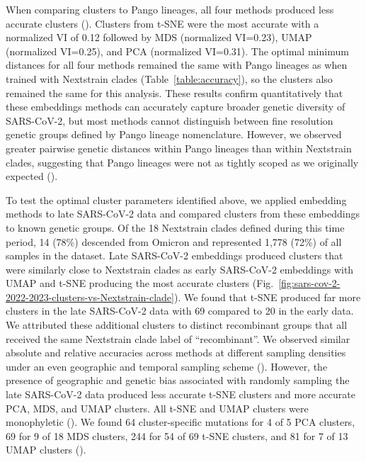 \documentclass[10pt,letterpaper]{article}
\begin{document}
When comparing clusters to Pango lineages, all four methods produced less accurate clusters ().
Clusters from t-SNE were the most accurate with a normalized VI of 0.12 followed by MDS (normalized VI=0.23), UMAP (normalized VI=0.25), and PCA (normalized VI=0.31).
The optimal minimum distances for all four methods remained the same with Pango lineages as when trained with Nextstrain clades (Table~\ref{table:accuracy}), so the clusters also remained the same for this analysis.
These results confirm quantitatively that these embeddings methods can accurately capture broader genetic diversity of SARS-CoV-2, but most methods cannot distinguish between fine resolution genetic groups defined by Pango lineage nomenclature.
However, we observed greater pairwise genetic distances within Pango lineages than within Nextstrain clades, suggesting that Pango lineages were not as tightly scoped as we originally expected ().

To test the optimal cluster parameters identified above, we applied embedding methods to late SARS-CoV-2 data and compared clusters from these embeddings to known genetic groups.
Of the 18 Nextstrain clades defined during this time period, 14 (78\%) descended from Omicron and represented 1,778 (72\%) of all samples in the dataset.
Late SARS-CoV-2 embeddings produced clusters that were similarly close to Nextstrain clades as early SARS-CoV-2 embeddings with UMAP and t-SNE producing the most accurate clusters (Fig.~\ref{fig:sars-cov-2-2022-2023-clusters-vs-Nextstrain-clade}).
We found that t-SNE produced far more clusters in the late SARS-CoV-2 data with 69 compared to 20 in the early data.
We attributed these additional clusters to distinct recombinant groups that all received the same Nextstrain clade label of ``recombinant''.
We observed similar absolute and relative accuracies across methods at different sampling densities under an even geographic and temporal sampling scheme ().
However, the presence of geographic and genetic bias associated with randomly sampling the late SARS-CoV-2 data produced less accurate t-SNE clusters and more accurate PCA, MDS, and UMAP clusters.
All t-SNE and UMAP clusters were monophyletic ().
We found 64 cluster-specific mutations for 4 of 5 PCA clusters, 69 for 9 of 18 MDS clusters, 244 for 54 of 69 t-SNE clusters, and 81 for 7 of 13 UMAP clusters ().
\end{document}

